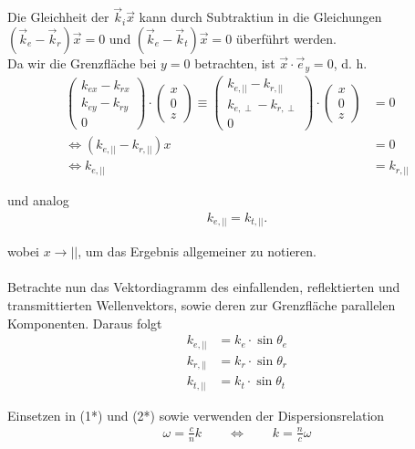 \documentclass{article}
\begin{document}
{	Die Gleichheit der $\vec{k}_i\vec{x}$ kann durch Subtraktiun in die Gleichungen $(\vec{k}_e - \vec{k}_r)\vec{x} = 0$ und $(\vec{k}_e - \vec{k}_t)\vec{x} = 0$ überführt werden.\\
	Da wir die Grenzfläche bei $y=0$ betrachten, ist $\vec{x}\cdot \vec{e}_y = 0$, d. h.
		\begin{align*}
			\begin{pmatrix}
				k_{ex} - k_{rx} \\
				k_{ey} - k_{ry} \\
				0
			\end{pmatrix}
			\cdot
			\begin{pmatrix}
				x\\0\\z
			\end{pmatrix}
			\equiv
			\begin{pmatrix}
				k_{e,||} - k_{r,||} \\
				k_{e,\perp} - k_{r,\perp} \\
				0
			\end{pmatrix}
			\cdot
			\begin{pmatrix}
				x\\0\\z
			\end{pmatrix}
			&= 0 \\
			\Leftrightarrow (k_{e,||} - k_{r,||}) x &= 0 \\
			\Leftrightarrow k_{e,||} &= k_{r,||} \tag{1*}
		\end{align*}

	und analog
		\begin{align*}
			k_{e,||} = k_{t,||}.	\tag{2*}
		\end{align*}
	
	\textcolor{gruen}{wobei $x\to ||$, um das Ergebnis allgemeiner zu notieren.}\\
\\
	Betrachte nun das Vektordiagramm des einfallenden, reflektierten und transmittierten Wellenvektors, sowie deren zur Grenzfläche parallelen Komponenten. Daraus folgt
		\begin{align*}
			k_{e,||} &= k_e\cdot \sin\theta_e \\
			k_{r,||} &= k_r\cdot \sin\theta_r \\
			k_{t,||} &= k_t\cdot \sin\theta_t
		\end{align*}
	
	Einsetzen in (1*) und (2*) sowie verwenden der Dispersionsrelation
		\begin{align*}
			\omega = \frac{c}{n} k \qquad \Leftrightarrow \qquad k = \frac{n}{c} \omega
		\end{align*}
	
}
\end{document}
